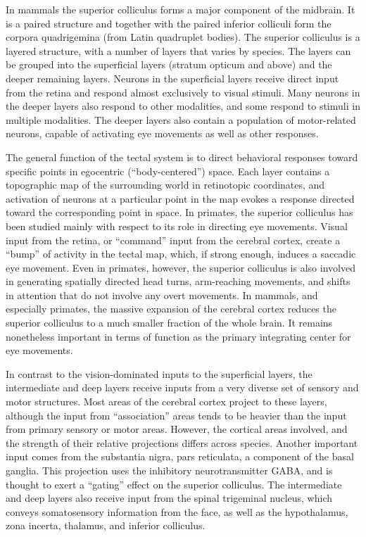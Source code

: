 In mammals the superior colliculus forms a major component of the midbrain. It is a paired structure and together with the paired inferior colliculi form the corpora quadrigemina (from Latin quadruplet bodies). The superior colliculus is a layered structure, with a number of layers that varies by species. The layers can be grouped into the superficial layers (stratum opticum and above) and the deeper remaining layers. Neurons in the superficial layers receive direct input from the retina and respond almost exclusively to visual stimuli. Many neurons in the deeper layers also respond to other modalities, and some respond to stimuli in multiple modalities. The deeper layers also contain a population of motor-related neurons, capable of activating eye movements as well as other responses.

The general function of the tectal system is to direct behavioral responses toward specific points in egocentric (``body-centered'') space. Each layer contains a topographic map of the surrounding world in retinotopic coordinates, and activation of neurons at a particular point in the map evokes a response directed toward the corresponding point in space. In primates, the superior colliculus has been studied mainly with respect to its role in directing eye movements. Visual input from the retina, or ``command'' input from the cerebral cortex, create a ``bump'' of activity in the tectal map, which, if strong enough, induces a saccadic eye movement. Even in primates, however, the superior colliculus is also involved in generating spatially directed head turns, arm-reaching movements, and shifts in attention that do not involve any overt movements. In mammals, and especially primates, the massive expansion of the cerebral cortex reduces the superior colliculus to a much smaller fraction of the whole brain. It remains nonetheless important in terms of function as the primary integrating center for eye movements.

In contrast to the vision-dominated inputs to the superficial layers, the intermediate and deep layers receive inputs from a very diverse set of sensory and motor structures. Most areas of the cerebral cortex project to these layers, although the input from ``association'' areas tends to be heavier than the input from primary sensory or motor areas. However, the cortical areas involved, and the strength of their relative projections differs across species. Another important input comes from the substantia nigra, pars reticulata, a component of the basal ganglia. This projection uses the inhibitory neurotransmitter GABA, and is thought to exert a ``gating'' effect on the superior colliculus. The intermediate and deep layers also receive input from the spinal trigeminal nucleus, which conveys somatosensory information from the face, as well as the hypothalamus, zona incerta, thalamus, and inferior colliculus.


